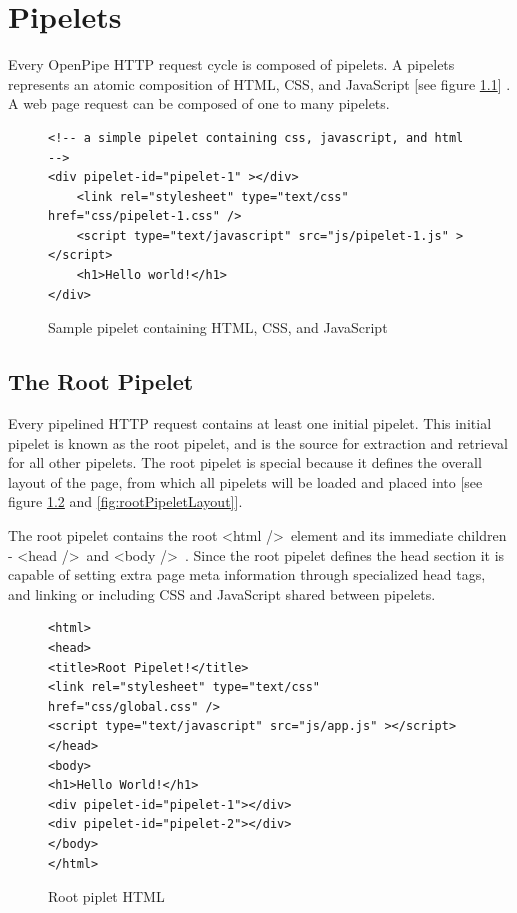 \documentclass[12pt]{report}
\begin{document}
\chapter{Pipelets}

Every OpenPipe HTTP request cycle is composed of pipelets. A pipelets represents an atomic composition of HTML, CSS, and JavaScript [see figure \ref{fig:samplePipelet}] . A web page request can be composed of one to many pipelets.

\begin{figure}[H]
\label{fig:samplePipelet}
\begin{lstlisting}
<!-- a simple pipelet containing css, javascript, and html -->
<div pipelet-id="pipelet-1" ></div>
	<link rel="stylesheet" type="text/css" href="css/pipelet-1.css" />
	<script type="text/javascript" src="js/pipelet-1.js" ></script>
	<h1>Hello world!</h1>
</div>
\end{lstlisting}
\caption{Sample pipelet containing HTML, CSS, and JavaScript}
\end{figure}


\section{The Root Pipelet}
Every pipelined HTTP request contains at least one initial pipelet. This initial pipelet is known as the root pipelet, and is the source for extraction and retrieval for all other pipelets. The root pipelet is special because it defines the overall layout of the page, from which all pipelets will be loaded and placed into [see figure \ref{fig:sampleRootPipelet} and \ref{fig:rootPipeletLayout}]. 
	
The root pipelet contains the root \textless html /\textgreater\ element and its immediate children - \textless head /\textgreater\ and \textless body /\textgreater\	. Since the root pipelet defines the head section it is capable of setting extra page meta information through specialized head tags, and linking or including CSS and JavaScript shared between pipelets.

\begin{figure}[H]
\label{fig:sampleRootPipelet}
\begin{lstlisting}
<html>
<head>
<title>Root Pipelet!</title>
<link rel="stylesheet" type="text/css" href="css/global.css" />
<script type="text/javascript" src="js/app.js" ></script>
</head>
<body>
<h1>Hello World!</h1>
<div pipelet-id="pipelet-1"></div>
<div pipelet-id="pipelet-2"></div>
</body>
</html>
\end{lstlisting}
\caption{Root piplet HTML}
\end{figure}
\end{document}
